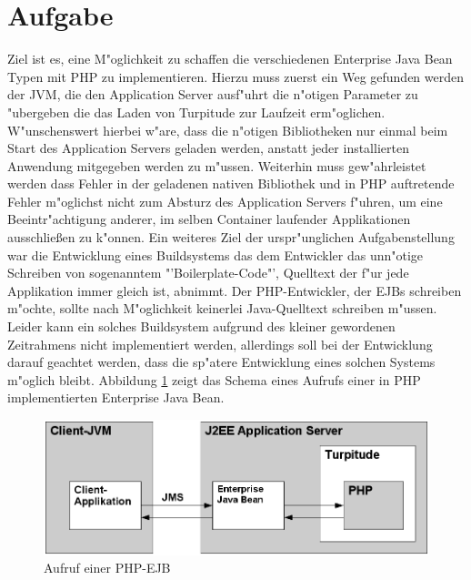 \section{Aufgabe}
\label{sec:chap2:task}

Ziel ist es, eine M"oglichkeit zu schaffen die verschiedenen Enterprise Java Bean Typen mit 
PHP zu implementieren. Hierzu muss zuerst ein Weg gefunden werden der JVM, die den Application Server 
ausf"uhrt die n"otigen Parameter zu "ubergeben die das Laden von Turpitude zur Laufzeit erm"oglichen.
W"unschenswert hierbei w"are, dass die n"otigen Bibliotheken nur einmal beim Start des Application Servers
geladen werden, anstatt jeder installierten Anwendung mitgegeben werden zu m"ussen. Weiterhin muss gew"ahrleistet
werden dass Fehler in der geladenen nativen Bibliothek und in PHP auftretende Fehler m"oglichst nicht zum Absturz des
Application Servers f"uhren, um eine Beeintr"achtigung anderer, im selben Container laufender Applikationen ausschlie\ss en 
zu k"onnen. Ein weiteres Ziel der urspr"unglichen Aufgabenstellung war die Entwicklung eines Buildsystems das dem
Entwickler das unn"otige Schreiben von sogenanntem "'Boilerplate-Code"', Quelltext der f"ur jede
Applikation immer gleich ist, abnimmt. Der PHP-Entwickler, der EJBs schreiben m"ochte, sollte nach M"oglichkeit
keinerlei Java-Quelltext schreiben m"ussen. Leider kann ein solches Buildsystem aufgrund des kleiner
gewordenen Zeitrahmens nicht implementiert werden, allerdings soll bei der Entwicklung darauf geachtet werden,
dass die sp"atere Entwicklung eines solchen Systems m"oglich bleibt.
Abbildung \ref{fig:phpejb} zeigt das Schema eines Aufrufs einer in PHP implementierten Enterprise Java Bean.

\begin{figure}[h]
\includegraphics[width=\textwidth]{chap2/img/phpejb.png}
\caption{Aufruf einer PHP-EJB}
\label{fig:phpejb}
\end{figure}

